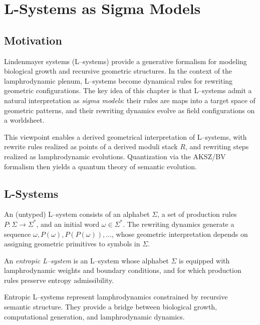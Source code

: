 
\chapter{L-Systems as Sigma Models}
\label{chap:lsystems-sigmamodels}

\section{Motivation}

Lindenmayer systems (L--systems) provide a generative formalism for
modeling biological growth and recursive geometric structures. In the
context of the lamphrodynamic plenum, L--systems become dynamical rules
for rewriting geometric configurations. The key idea of this chapter is
that L--systems admit a natural interpretation as \emph{sigma models}:
their rules are maps into a target space of geometric patterns, and
their rewriting dynamics evolve as field configurations on a worldsheet.

This viewpoint enables a derived geometrical interpretation of
L--systems, with rewrite rules realized as points of a derived moduli
stack $R$, and rewriting steps realized as lamphrodynamic evolutions.
Quantization via the AKSZ/BV formalism then yields a quantum theory of
semantic evolution.

\section{L-Systems}

An (untyped) L--system consists of an alphabet $\Sigma$, a set of
production rules $P\colon \Sigma\to \Sigma^\ast$, and an initial word
$\omega\in\Sigma^\ast$. The rewriting dynamics generate a sequence
$\omega, P(\omega), P(P(\omega)),\dots$, whose geometric interpretation
depends on assigning geometric primitives to symbols in $\Sigma$.

\begin{definition}
An \emph{entropic L--system} is an L--system whose alphabet $\Sigma$
is equipped with lamphrodynamic weights and boundary conditions, and for
which production rules preserve entropy admissibility.
\end{definition}

\begin{remark}
Entropic L--systems represent lamphrodynamics constrained by recursive
semantic structure. They provide a bridge between biological growth,
computational generation, and lamphrodynamic dynamics.
\end{remark}

